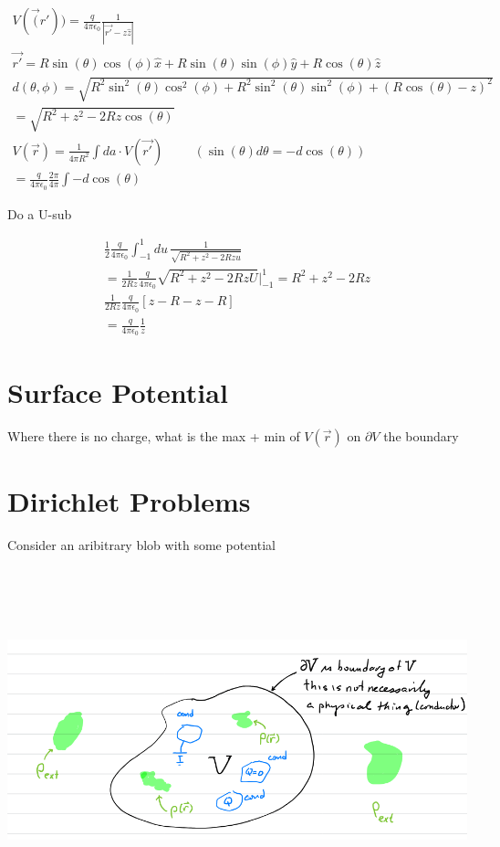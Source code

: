 \documentclass[fleqn]{report}
\newcommand{\hp}{\hspace{1cm}}
\newcommand{\del}{\partial}
\newcommand{\equations} [1] {
\begin{gather*}
#1
\end{gather*}
}
\begin{document}
\equations{
    V(\vec(r')) = \frac{q}{4 \pi \epsilon_0} \frac{1}{|\vec{r'} - z \hat z|}
    \\
    \vec{r'}
    =
    R \sin(\theta) \cos(\phi) \hat x 
    +
    R \sin(\theta) \sin(\phi) \hat y 
    +
    R \cos(\theta) \hat z
    \\
    d(\theta, \phi)
    =
    \sqrt{
        R^2 \sin^2(\theta) \cos^2(\phi)
        +
        R^2 \sin^2(\theta) \sin^2(\phi)
        +
        (R \cos(\theta) - z)^2 
    }
    \\
    =
    \sqrt{R^2 + z^2 - 2 Rz\cos(\theta)}
    \\
    V(\vec{r}) 
    =
    \frac{1}{4 \pi R^2} \int da \cdot V(\vec{r'})
    \hp
    (\sin(\theta) d \theta = - d \cos(\theta))
    \\
    = \frac{q}{4 \pi \epsilon_0} \frac{2 \pi}{4 \pi} \int -d \cos(\theta)
}
Do a U-sub 
\equations{
    \frac{1}{2} \frac{q}{4 \pi \epsilon_0} 
    \int^1_{-1} du \, \frac{1}{\sqrt{R^2 + z^2 - 2 R z u}}
    \\
    =
    \frac{1}{2 R z} \frac{q}{4 \pi \epsilon_0} \sqrt{R^2 + z^2 - 2RzU} 
    \Big|^1_{-1}
    =
    R^2 + z^2 - 2 Rz
    \\
    \frac{1}{2 R z} \frac{q}{4 \pi \epsilon_0}
    \left[
        z - R - z - R
    \right]
    \\
    =
    \frac{q}{4 \pi \epsilon_0} \frac{1}{z}
}

\section{Surface Potential}
Where there is no charge, what is the max + min of $V(\vec r)$ on $\del V$ the 
boundary 

\section{Dirichlet Problems}
Consider an aribitrary blob with some potential 

\includegraphics[width = 16cm, height = 10cm]{PHYS435.1.png}
\end{document}
